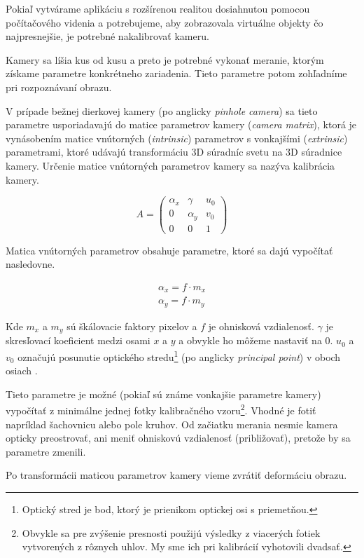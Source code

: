 Pokiaľ vytvárame aplikáciu s rozšírenou realitou dosiahnutou pomocou počítačového videnia a potrebujeme, aby zobrazovala virtuálne objekty čo najpresnejšie, je potrebné nakalibrovať kameru.

Kamery sa líšia kus od kusu a preto je potrebné vykonať meranie, ktorým získame parametre konkrétneho zariadenia. Tieto parametre potom zohľadníme pri rozpoznávaní obrazu.

V prípade bežnej dierkovej kamery (po anglicky \emph{pinhole camera}) sa tieto parametre usporiadavajú do matice parametrov kamery (\emph{camera matrix}), ktorá je vynásobením matice vnútorných (\emph{intrinsic}) parametrov s vonkajšími (\emph{extrinsic}) parametrami, ktoré udávajú transformáciu 3D súradníc svetu na 3D súradnice kamery. Určenie matice vnútorných parametrov kamery sa nazýva kalibrácia kamery.

\[
 A=
  \begin{pmatrix}
    \alpha_{x} & \gamma     & u_{0}\\
    0          & \alpha_{y} & v_{0}\\
    0          & 0          & 1
  \end{pmatrix}
\]

Matica vnútorných parametrov obsahuje parametre, ktoré sa dajú vypočítať nasledovne.

\begin{align}
\alpha_{x} = f \cdot m_{x} \\
\alpha_{y} = f \cdot m_{y}
\end{align}

Kde $m_{x}$ a $m_{y}$ sú škálovacie faktory pixelov a $f$ je ohnisková vzdialenosť. $\gamma$ je skresľovací koeficient medzi osami $x$ a $y$ a obvykle ho môžeme nastaviť na 0. $u_{0}$ a $v_{0}$ označujú posunutie optického stredu\footnote{Optický stred je bod, ktorý je prienikom optickej osi s priemetňou.} (po anglicky \emph{principal point}) v oboch osiach \cite{Hartley03}.

Tieto parametre je možné (pokiaľ sú známe vonkajšie parametre kamery) vypočítať z minimálne jednej fotky kalibračného vzoru\footnote{Obvykle sa pre zvýšenie presnosti použijú výsledky z viacerých fotiek vytvorených z rôznych uhlov. My sme ich pri kalibrácií vyhotovili dvadsať.}. Vhodné je fotiť napríklad šachovnicu alebo pole kruhov. Od začiatku merania nesmie kamera opticky preostrovať, ani meniť ohniskovú vzdialenosť (približovať), pretože by sa parametre zmenili.

Po transformácii maticou parametrov kamery vieme zvrátiť deformáciu obrazu.

